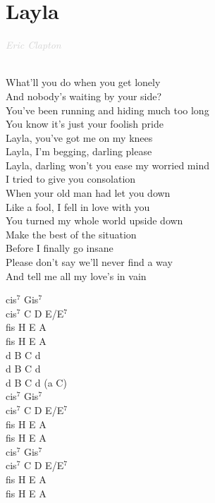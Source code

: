 \documentclass[a5paper, 10pt]{book}
\begin{document}
\section{Layla}\textcolor{lightgray}{\textit{ Eric Clapton}}\\~\\
\begin{minipage}[t]{0.7\textwidth}
  What'll you do when you get lonely\\
  And nobody's waiting by your side?\\
  You've been running and hiding much too long\\
  You know it's just your foolish pride\\

  \hspace*{2mm} Layla, you've got me on my knees\\
  \hspace*{2mm} Layla, I'm begging, darling please\\
  \hspace*{2mm} Layla, darling won't you ease my worried mind\\

  I tried to give you consolation\\
  When your old man had let you down\\
  Like a fool, I fell in love with you\\
  You turned my whole world upside down\\

  Make the best of the situation\\
  Before I finally go insane\\
  Please don't say we'll never find a way\\
  And tell me all my love's in vain\\

\end{minipage}
\begin{minipage}[t]{0.3\textwidth}
  cis$^7$  Gis$^7$  \\
  cis$^7$  C  D  E/E$^7$  \\
  fis  H  E  A  \\
  fis  H  E  A  \\

  d B C d\\
  d B C d\\
  d B C d (a C)\\

  cis$^7$  Gis$^7$  \\
  cis$^7$  C  D  E/E$^7$  \\
  fis  H  E  A  \\
  fis  H  E  A  \\

  cis$^7$  Gis$^7$  \\
  cis$^7$  C  D  E/E$^7$  \\
  fis  H  E  A  \\
  fis  H  E  A  \\

\end{minipage}
\end{document}
